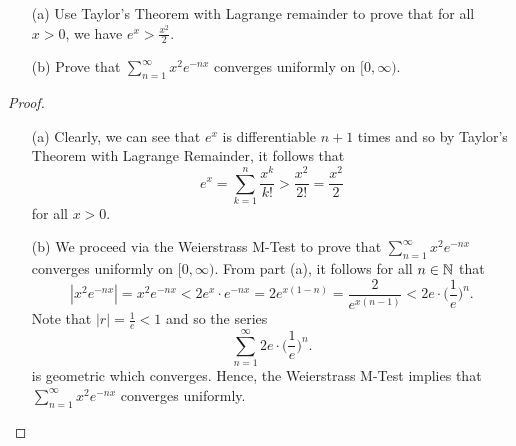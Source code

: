 \documentclass[a4paper]{article}
\begin{document}
\begin{problem}
    \begin{enumerate}
        \item[(a)] Use Taylor's Theorem with Lagrange remainder to prove that for all \( x > 0  \), we have \( e^{x} > \frac{ x^{2} }{ 2 }  \).
        \item[(b)] Prove that \( \sum_{ n=1  }^{ \infty  } x^{2} e^{-nx} \) converges uniformly on \( [0,\infty) \).
    \end{enumerate}
\end{problem}
\begin{proof}
\begin{enumerate}
    \item[(a)] Clearly, we can see that \( e^{x} \) is differentiable \( n + 1  \) times and so by Taylor's Theorem with Lagrange Remainder, it follows that  
        \[  e^{x} = \sum_{ k=1  }^{ n } \frac{ x^{k} }{ k! } > \frac{ x^{2} }{ 2! }  = \frac{ x^{2} }{ 2 } \]
        for all \( x > 0  \).
    \item[(b)] We proceed via the Weierstrass M-Test to prove that \(\sum_{ n=1  }^{ \infty  } x^{2} e^{-nx}\) converges uniformly on \( [0,\infty) \). From part (a), it follows for all \( n \in \mathbb{N} \) that 
        \[  | x^{2} e^{-nx} | = x^{2} e^{-nx} < 2 e^{x} \cdot e^{-nx} = 2 e^{x(1-n)} = \frac{ 2 }{ e^{x(n-1)} } < 2e \cdot \Big(  \frac{ 1 }{ e }  \Big)^{n}.  \]
        Note that \( | r  |  = \frac{ 1 }{ e  }  < 1  \) and so the series 
        \[  \sum_{ n=1  }^{ \infty  } 2e \cdot \Big(  \frac{ 1 }{ e  }  \Big)^{n}. \]
        is geometric which converges.
        Hence, the Weierstrass M-Test implies that \( \sum_{ n=1  }^{ \infty  } x^{2} e^{-nx} \) converges uniformly.
\end{enumerate}
\end{proof}
\end{document}
